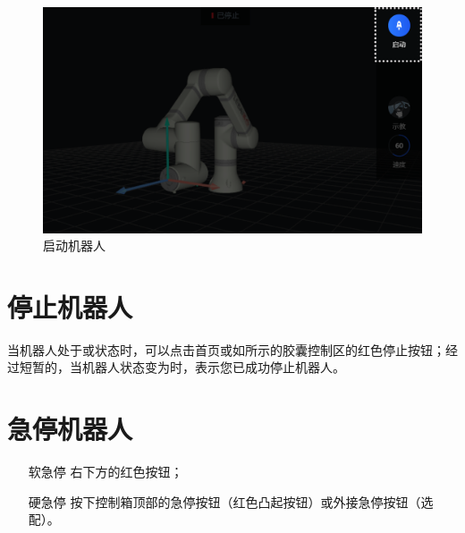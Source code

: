 \begin{figure}[ht]
	\centering
	\includegraphics[width=\textwidth]{image/07/图2.17 启动机器人.png}
	\caption{启动机器人}
	\label{fig:启动机器人}
\end{figure}

\section{停止机器人}
当机器人处于或状态时，可以点击首页或如所示的胶囊控制区的红色停止按钮；经过短暂的，当机器人状态变为时，表示您已成功停止机器人。


\section{急停机器人}

\begin{itemize}[leftmargin=3.5em]
	\item[软急停] \LM 右下方的红色按钮；
	\item[硬急停] 按下控制箱顶部的急停按钮（红色凸起按钮）或外接急停按钮（选配）。
\end{itemize}


